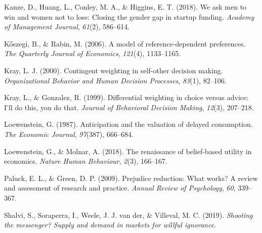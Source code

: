 \documentclass[
  man,floatsintext]{apa6}
\newlength{\cslhangindent}
\newlength{\cslentryspacingunit} %
\newenvironment{CSLReferences}[2] %
 {%
  \setlength{\parindent}{0pt}
  \ifodd #1
  \let\oldpar\par
  \def\par{\hangindent=\cslhangindent\oldpar}
  \fi
  \setlength{\parskip}{#2\cslentryspacingunit}
 }%
 {}
\begin{document}
\begin{CSLReferences}{1}{0}
\leavevmode{}%
Kanze, D., Huang, L., Conley, M. A., \& Higgins, E. T. (2018). We ask men to win and women not to lose: {Closing} the gender gap in startup funding. \emph{Academy of Management Journal}, \emph{61}(2), 586--614.

\leavevmode{}%
Kőszegi, B., \& Rabin, M. (2006). A model of reference-dependent preferences. \emph{The Quarterly Journal of Economics}, \emph{121}(4), 1133--1165.

\leavevmode{}%
Kray, L. J. (2000). Contingent weighting in self-other decision making. \emph{Organizational Behavior and Human Decision Processes}, \emph{83}(1), 82--106.

\leavevmode{}%
Kray, L., \& Gonzalez, R. (1999). Differential weighting in choice versus advice: {I}'ll do this, you do that. \emph{Journal of Behavioral Decision Making}, \emph{12}(3), 207--218.

\leavevmode{}%
Loewenstein, G. (1987). Anticipation and the valuation of delayed consumption. \emph{The Economic Journal}, \emph{97}(387), 666--684.

\leavevmode{}%
Loewenstein, G., \& Molnar, A. (2018). The renaissance of belief-based utility in economics. \emph{Nature Human Behaviour}, \emph{2}(3), 166--167.

\leavevmode{}%
Paluck, E. L., \& Green, D. P. (2009). Prejudice reduction: What works? A review and assessment of research and practice. \emph{Annual Review of Psychology}, \emph{60}, 339--367.

\leavevmode{}%
Shalvi, S., Soraperra, I., Weele, J. J. van der, \& Villeval, M. C. (2019). \emph{Shooting the messenger? Supply and demand in markets for willful ignorance}.

\end{CSLReferences}

\endgroup
\end{document}
